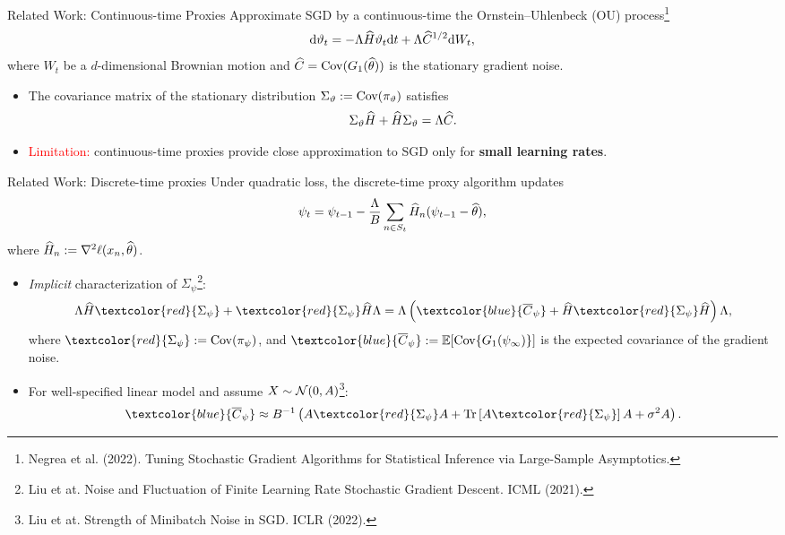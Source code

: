\documentclass[10pt,xcolor=table]{beamer}
\begin{document}
\begin{frame}{Related Work: Continuous-time Proxies}
Approximate SGD by a continuous-time the Ornstein--Uhlenbeck (OU) process\footnote{Negrea et al. (2022). Tuning Stochastic Gradient Algorithms for Statistical Inference via Large-Sample Asymptotics.}
$$
	\mathrm{d} \vartheta_{t} = -\Lambda \widehat{H} \vartheta_{t} \mathrm{d} t + \Lambda \widehat{C}^{1/2} \mathrm{d} W_{t},
$$
where $W_{t}$ be a $d$-dimensional Brownian motion and $\widehat{C} = \operatorname{Cov}(G_{1}(\widehat{\theta}))$ is the stationary gradient noise. \pause
\begin{itemize}
	\item The covariance matrix of the stationary distribution $\Sigma_{\vartheta} := \operatorname{Cov}(\pi_{\vartheta})$ 
	satisfies 
	$$\Sigma_{\vartheta} \widehat{H} + \widehat{H} \Sigma_{\vartheta} = \Lambda \widehat{C}.$$ \pause
	\item \textcolor{red}{Limitation:} continuous-time proxies provide close approximation to SGD only for \textbf{small learning rates}.
\end{itemize}

\end{frame}

\begin{frame}{Related Work: Discrete-time proxies}
Under quadratic loss, the discrete-time proxy algorithm updates 
\begin{equation*}
	\label{eq:discrete-time-model-general}
	\psi_{t} = \psi_{t-1} - \frac{\Lambda}{B}\sum_{n\in S_{t}} \widehat{H}_{n} (\psi_{t-1} - \widehat{\theta}),
\end{equation*}
where $\widehat{H}_{n} :=  \nabla^{2} \ell(x_{n}, \widehat{\theta})$.
\begin{itemize} \pause 
	\item \emph{Implicit} characterization of $\Sigma_{\psi}$\footnote{Liu et at. Noise and Fluctuation of Finite Learning Rate Stochastic Gradient Descent. ICML (2021).}:
	\begin{equation*}
		\Lambda \hess \textcolor{red}{\Sigma_{\psi}} + \textcolor{red}{\Sigma_{\psi}}  \hess \Lambda = \Lambda \left( \textcolor{blue}{\overline{C}_{\psi}}+ \hess \textcolor{red}{\Sigma_{\psi}} \hess \right)\Lambda,
		\label{eq: SGD stationary covariance}
	\end{equation*}
where $\textcolor{red}{\Sigma_{\psi}} \defas \cov(\pi_{\psi})$, and $\textcolor{blue}{\overline{C}_{\psi}} \defas \E[\cov\{G_{1}(\psi_{\infty})\}]$ is the expected covariance of the gradient noise. 
	\item For well-specified linear model and assume $X \sim \mathcal{N}(0, A)$\footnote{Liu et at. Strength of Minibatch Noise in SGD. ICLR (2022).}: 
	\begin{equation*}
		\textcolor{blue}{\overline{C}_{\psi}} %
		\approx B^{-1} \left( A \textcolor{red}{\Sigma_{\psi}} A + \Tr \left[ A \textcolor{red}{\Sigma_{\psi}} \right]A + \sigma^{2} A \right).
		\label{eq: sgd noise in well-specified linear model}
	\end{equation*}
	
\end{itemize}
	
\end{frame}
\end{document}
